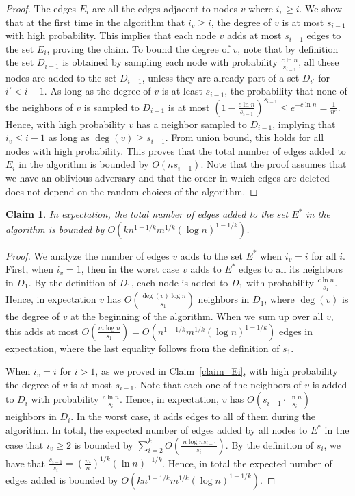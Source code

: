\documentclass[11pt]{article}
\newtheorem{claim}[theorem]{Claim}
\theoremstyle{definition}
\theoremstyle{remark}
\begin{document}
\begin{titlepage}
\begin{proof}
The edges $E_i$ are all the edges adjacent to nodes $v$ where $i_v \geq i$. We show that at the first time in the algorithm that $i_v \geq i$, the degree of $v$ is at most $s_{i-1}$ with high probability. This implies that each node $v$ adds at most $s_{i-1}$ edges to the set $E_i$, proving the claim. 
To bound the degree of $v$, note that by definition the set $D_{i-1}$ is obtained by sampling each node with probability $\frac{c \ln{n}}{s_{i-1}}$, all these nodes are added to the set $D_{i-1}$, unless they are already part of a set $D_{i'}$ for $i' < i-1$. As long as the degree of $v$ is at least $s_{i-1}$, the probability that none of the neighbors of $v$ is sampled to $D_{i-1}$ is at most $(1-\frac{c\ln{n}}{s_{i-1}})^{s_{i-1}} \leq e^{-c\ln{n}}=\frac{1}{n^c}$. Hence, with high probability $v$ has a neighbor sampled to $D_{i-1}$, implying that $i_v \leq i-1$ as long as $\deg(v) \geq s_{i-1}$. From union bound, this holds for all nodes with high probability. This proves that the total number of edges added to $E_i$ in the algorithm is bounded by $O(ns_{i-1})$. Note that the proof assumes that we have an oblivious adversary and that the order in which edges are deleted does not depend on the random choices of the algorithm.
\end{proof}

\begin{claim}\label{claim_E*}
In expectation, the total number of edges added to the set $E^*$ in the algorithm is bounded by $O(kn^{1-1/k}m^{1/k}(\log{n})^{1-1/k})$.
\end{claim}

\begin{proof}
We analyze the number of edges $v$ adds to the set $E^*$ when $i_v=i$ for all $i$. First, when $i_v=1$, then in the worst case $v$ adds to $E^*$ edges to all its neighbors in $D_1$. By the definition of $D_1$, each node is added to $D_1$ with probability $\frac{c\ln{n}}{s_1}$. Hence, in expectation $v$ has $O(\frac{\deg(v) \log{n}}{s_1})$ neighbors in $D_1$, where $\deg(v)$ is the degree of $v$ at the beginning of the algorithm. When we sum up over all $v$, this adds at most $O(\frac{m \log{n}}{s_1})=O(n^{1-1/k}m^{1/k}(\log{n})^{1-1/k})$ edges in expectation, where the last equality follows from the definition of $s_1$.

When $i_v=i$ for $i > 1$, as we proved in Claim~\ref{claim_Ei}, with high probability the degree of $v$ is at most $s_{i-1}$. Note that each one of the neighbors of $v$ is added to $D_i$ with probability $\frac{c\ln{n}}{s_i}$. Hence, in expectation, $v$ has $O(s_{i-1} \cdot \frac{\ln{n}}{s_i})$ neighbors in $D_i$. In the worst case, it adds edges to all of them during the algorithm. In total, the expected number of edges added by all nodes to $E^*$ in the case that $i_v \geq 2$ is bounded by $\sum_{i=2}^{k} O(\frac{\ n \log{n} s_{i-1}}{s_i})$.
By the definition of $s_i$, we have that $\frac{s_{i-1}}{s_i}=(\frac{m}{n})^{1/k}(\ln{n})^{-1/k}$. Hence, in total the expected number of edges added is bounded by $O(k n^{1-1/k}m^{1/k}(\log{n})^{1-1/k}).$
\end{proof}


\end{titlepage}
\end{document}
